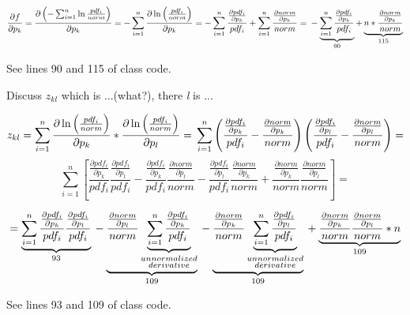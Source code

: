 \documentclass[a4paper,10pt]{article}
\begin{document}
$$\frac{\partial f}{\partial p_k} = \frac{\partial \left( - \sum_{i=1}^n \ln \frac{pdf_i}{norm} \right)}{\partial p_k} = -\sum_{i=1}^n \frac{\partial \ln \left( \frac{pdf_i}{norm} \right)}{\partial p_k} = - \sum_{i=1}^n \frac{\frac{\partial pdf_i}{\partial p_k}}{pdf_i} + \sum_{i=1}^n \frac{\frac{\partial norm}{\partial p_k}}{norm} = \\
- \underbrace{\sum_{i=1}^n \frac{\frac{\partial pdf_i}{\partial p_k}}{pdf_i}}_{90} + \underbrace{n* \frac{\frac{\partial norm}{\partial p_k}}{norm}}_{115} $$

See lines 90 and 115 of class code.

Discuss $z_{kl}$ which is ...(what?), there \textit{l} is ...

$$z_{kl} = \sum_{i=1}^n \frac{\partial \ln \left( \frac{pdf_i}{norm} \right)}{\partial p_k} * \frac{\partial \ln \left( \frac{pdf_i}{norm}\right)}{\partial p_l} = \\
\sum_{i=1}^n \left( \frac{\frac{\partial pdf_i}{\partial p_k}}{pdf_i} - \frac{\frac{\partial norm}{\partial p_k}}{norm}\right) \left( \frac{\frac{\partial pdf_i}{\partial p_l}}{pdf_i} - \frac{\frac{\partial norm}{\partial p_l}}{norm}\right) = $$
$$\sum_{i=1}^n \left[\frac{\frac{\partial pdf_i}{\partial p_k}}{pdf_i} \frac{\frac{\partial pdf_i}{\partial p_l}}{pdf_i} - \frac{\frac{\partial pdf_i}{\partial p_k}}{pdf_i} \frac{\frac{\partial norm}{\partial p_l}}{norm}   -  \frac{\frac{\partial pdf_i}{\partial p_l}}{pdf_i} \frac{\frac{\partial norm}{\partial p_k}}{norm} +  \frac{\frac{\partial norm}{\partial p_k}}{norm} \frac{\frac{\partial norm}{\partial p_l}}{norm} \right] = $$

$$ = \underbrace{\sum_{i=1}^n \frac{\frac{\partial pdf_i}{\partial p_k}}{pdf_i} \frac{\frac{\partial pdf_i}{\partial p_l}}{pdf_i}}_{93} \\
- \underbrace{\frac{\frac{\partial norm}{\partial p_l}}{norm}  \underbrace{\sum_{i=1}^n \frac{\frac{\partial pdf_i}{\partial p_k}}{pdf_i}}_{\substack{unnormalized\\derivative}}}_{109} \\
- \underbrace{\frac{\frac{\partial norm}{\partial p_k}}{norm}  \underbrace{\sum_{i=1}^n \frac{\frac{\partial pdf_i}{\partial p_l}}{pdf_i}}_{\substack{unnormalized\\derivative}}}_{109} \\
+ \underbrace{\frac{\frac{\partial norm}{\partial p_k}}{norm} \frac{\frac{\partial norm}{\partial p_l}}{norm}*n}_{109} $$

See lines 93 and 109 of class code.
\end{document}
